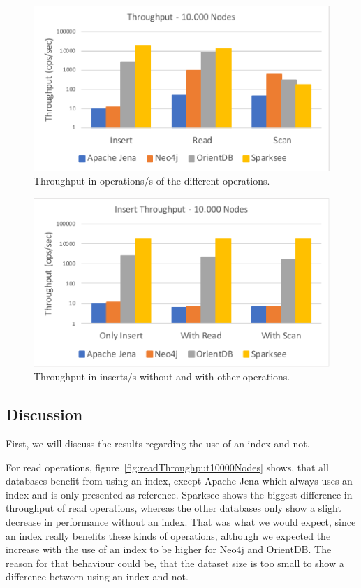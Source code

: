 \begin{figure}[h!]
  \centering
  \includegraphics[width=.75\textwidth]{images/responsiveness/operationReadScan}
  \caption{Throughput in operations/s of the different operations.}
  \label{fig:operationReadScan}
\end{figure}

\begin{figure}[h!]
  \centering
  \includegraphics[width=.75\textwidth]{images/responsiveness/insertWithWithoutReadScan}
  \caption{Throughput in inserts/s without and with other operations.}
  \label{fig:insertWithWithoutReadScan}
\end{figure}

\subsection{Discussion}
First,
we will discuss the results regarding the use of an index and not.

For read operations,
figure~\ref{fig:readThroughput10000Nodes} shows,
that all databases benefit from using an index,
except Apache Jena which always uses an index and is only presented as reference.
Sparksee shows the biggest difference in throughput of read operations,
whereas the other databases only show a slight decrease in performance without an index.
That was what we would expect,
since an index really benefits these kinds of operations,
although we expected the increase with the use of an index to be higher for Neo4j and OrientDB.
The reason for that behaviour could be,
that the dataset size is too small to show a difference between using an index and not.

